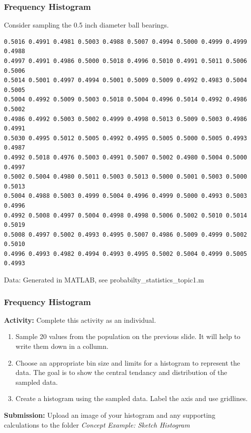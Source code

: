 \documentclass[fleqn]{beamer} %
\newcommand{\sectiontitleIII}{Frequency Histogram}
\begin{document}
	\begin{frame}[containsverbatim] \small
		\frametitle{\sectiontitleIII}    

Consider sampling the 0.5 inch diameter ball bearings.
\lstset{basicstyle=\scriptsize}


\begin{lstlisting}
0.5016 0.4991 0.4981 0.5003 0.4988 0.5007 0.4994 0.5000 0.4999 0.4999 0.4988  
0.4997 0.4991 0.4986 0.5000 0.5018 0.4996 0.5010 0.4991 0.5011 0.5006 0.5006  
0.5014 0.5001 0.4997 0.4994 0.5001 0.5009 0.5009 0.4992 0.4983 0.5004 0.5005 
0.5004 0.4992 0.5009 0.5003 0.5018 0.5004 0.4996 0.5014 0.4992 0.4986 0.5002 
0.4986 0.4992 0.5003 0.5002 0.4999 0.4998 0.5013 0.5009 0.5003 0.4986 0.4991
0.5030 0.4995 0.5012 0.5005 0.4992 0.4995 0.5005 0.5000 0.5005 0.4993 0.4987 
0.4992 0.5018 0.4976 0.5003 0.4991 0.5007 0.5002 0.4980 0.5004 0.5000 0.4997 
0.5002 0.5004 0.4980 0.5011 0.5003 0.5013 0.5000 0.5001 0.5003 0.5000 0.5013  
0.5004 0.4988 0.5003 0.4999 0.5004 0.4996 0.4999 0.5000 0.4993 0.5003 0.4996  
0.4992 0.5008 0.4997 0.5004 0.4998 0.4998 0.5006 0.5002 0.5010 0.5014 0.5019
0.5008 0.4997 0.5002 0.4993 0.4995 0.5007 0.4986 0.5009 0.4999 0.5002 0.5010  
0.4996 0.4993 0.4982 0.4994 0.4993 0.4995 0.5002 0.5004 0.4999 0.5005 0.4993 
\end{lstlisting}
		
		{\tiny Data: Generated in MATLAB, see probabilty\_statistics\_topic1.m }

	\end{frame}

	\begin{frame}[containsverbatim] \scriptsize
		\frametitle{\sectiontitleIII}    

		\textbf{Activity:} Complete this activity as an individual.

			\begin{enumerate}
				\item Sample 20 values from the population on the previous slide. It will help to write them down in a collumn. 
				\item Choose an appropriate bin size and limits for a histogram to represent the data. The goal is to show the central tendancy and distribution of the sampled data.
				\item Create a histogram using the sampled data. Label the axis and use gridlines.	\vspace{5mm}\\
			\end{enumerate}

		\textbf{Submission:} Upload an image of your histogram and any supporting calculations to the folder {\it Concept Example: Sketch Histogram}	

	\end{frame}
\end{document}
